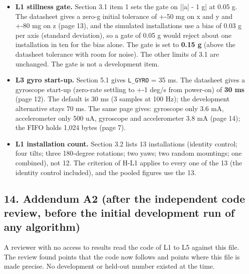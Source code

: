 \begin{itemize}
\item \textbf{L1 stillness gate.} Section 3.1 item 1 sets the gate on ||a| - 1 g| at 0.05 g. The datasheet gives a zero-g initial tolerance of +-50 mg on x and y and +-80 mg on z (page 13), and the simulated installations use a bias of 0.03 g per axis (standard deviation), so a gate of 0.05 g would reject about one installation in ten for the bias alone. The gate is set to \textbf{0.15 g} (above the datasheet tolerance with room for noise). The other limits of 3.1 are unchanged. The gate is not a development item.
\item \textbf{L3 gyro start-up.} Section 5.1 gives \texttt{L\_GYRO} = 35 ms. The datasheet gives a gyroscope start-up (zero-rate settling to +-1 deg/s from power-on) of \textbf{30 ms} (page 12). The default is 30 ms (3 samples at 100 Hz); the development alternative stays 70 ms. The same page gives: gyroscope only 3.6 mA, accelerometer only 500 uA, gyroscope and accelerometer 3.8 mA (page 14); the FIFO holds 1,024 bytes (page 7).
\item \textbf{L1 installation count.} Section 3.2 lists 13 installations (identity control; four tilts; three 180-degree rotations; two yaws; two random mountings; one combined), not 12. The criterion of H-L1 applies to every one of the 13 (the identity control included), and the pooled figures use the 13.
\end{itemize}


\subsection*{14. Addendum A2 (after the independent code review, before the initial development run of any algorithm)}

A reviewer with no access to results read the code of L1 to L5 against this file. The review found points that the code now follows and points where this file is made precise. No development or held-out number existed at the time.

